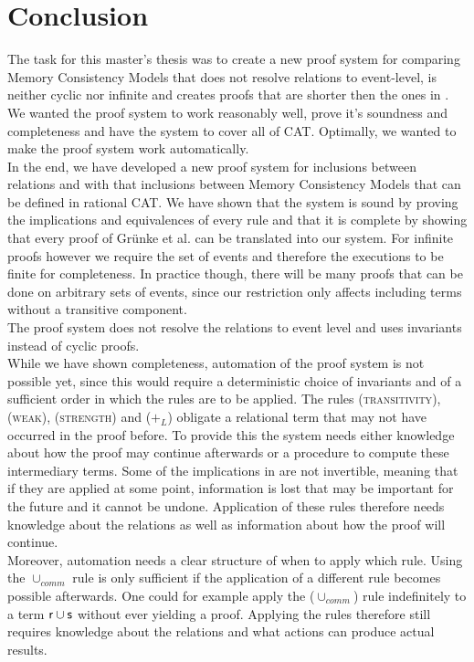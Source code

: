 \documentclass[a4paper,twoside,12pt, english]{article}
\begin{document}
\section{Conclusion}\label{sec:conclusion}
The task for this master's thesis was to create a new proof system for comparing Memory Consistency Models that does not resolve relations to event-level, is neither cyclic nor infinite and creates proofs that are shorter then the ones in \cite{Gru+26}. We wanted the proof system to work reasonably well, prove it's soundness and completeness and have the system to cover all of CAT. Optimally, we wanted to make the proof system work automatically. \\
In the end, we have developed a new proof system for inclusions between relations and with that inclusions between Memory Consistency Models that can be defined in rational CAT. We have shown that the system is sound by proving the implications and equivalences of every rule and that it is complete by showing that every proof of Grünke et al. can be translated into our system. For infinite proofs however we require the set of events and therefore the executions to be finite for completeness. In practice though, there will be many proofs that can be done on arbitrary sets of events, since our restriction only affects including terms without a transitive component. \\
The proof system does not resolve the relations to event level and uses invariants instead of cyclic proofs. \\
While we have shown completeness, automation of the proof system is not possible yet, since this would require a deterministic choice of invariants and of a sufficient order in which the rules are to be applied. The rules (\textsc{transitivity}), (\textsc{weak}), (\textsc{strength}) and ($+_L$) obligate a relational term that may not have occurred in the proof before. To provide this the system needs either knowledge about how the proof may continue afterwards or a procedure to compute these intermediary terms. Some of the implications in  are not invertible, meaning that if they are applied at some point, information is lost that may be important for the future and it cannot be undone. Application of these rules therefore needs knowledge about the relations as well as information about how the proof will continue. \\ 
Moreover, automation needs a clear structure of when to apply which rule. Using the $\cup_{comm}$ rule is only sufficient if the application of a different rule becomes possible afterwards. 
One could for example apply the ($\cup_{comm}$) rule indefinitely to a term $\textsf{\upshape r} \cup \textsf{\upshape s}$ without ever yielding a proof. Applying the rules therefore still requires knowledge about the relations and what actions can produce actual results. \\
\end{document}
